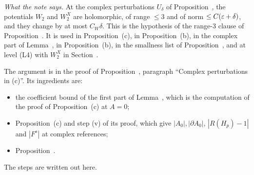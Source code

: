 \begin{detail}\label{d8:A1}
\emph{What the note says.} At the complex perturbations $U_\delta$ of Proposition~, the potentials $W_2$ and $W_2^X$ are holomorphic, of range $\le3$ and of norm $\le C(\varepsilon+\delta)$, and they change by at most $C_W\delta$. This is the hypothesis of the range-$3$ clause of Proposition~. It is used in Proposition~(c), in Proposition~(b), in the complex part of Lemma~, in Proposition~(b), in the smallness list of Proposition~, and at level (L4) with $W_2^X$ in Section~.

The argument is in the proof of Proposition~, paragraph ``Complex perturbations in (c)''. Its ingredients are:
\begin{itemize}
\item the coefficient bound of the first part of Lemma~, which is the computation of the proof of Proposition~(c) at $A=0$;
\item Proposition~(c) and step (v) of its proof, which give $|A_0|,|\partial A_0|$, $|R(H_p)-1|$ and $|F^s|$ at complex references;
\item Proposition~.
\end{itemize}
The steps are written out here.


\end{detail}
